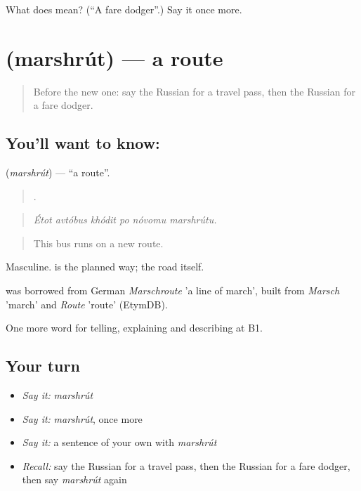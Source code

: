 \begin{tcolorbox}[breakable,colback=teal!4,colframe=teal!35!black,title={Before you move on}]
What does  mean? (\textquotedblleft{}A fare dodger\textquotedblright{}.) Say it once more.
\end{tcolorbox}
\section[\texorpdfstring{\ru{маршрут} (marshrút)}{маршрут (marshrút)}]{ (marshrút) — a route}

\label{lesson:RU-C417-marshrut}



\begin{quote}
Before the new one: say the Russian for a travel pass, then the Russian for a fare dodger.
\end{quote}

\subsection*{You'll want to know: }
\textbf{} (\emph{marshrút}) — \textquotedblleft{}a route\textquotedblright{}.

\begin{quote}
     .
\end{quote}

\begin{quote}
\emph{Étot avtóbus khódit po nóvomu marshrútu.}
\end{quote}

\begin{quote}
This bus runs on a new route.
\end{quote}

Masculine. \emph{} is the planned way; \emph{} the road itself.

\begin{cousinweb}
\emph{} was borrowed from German \emph{Marschroute} 'a line of march', built from \emph{Marsch} 'march' and \emph{Route} 'route' (EtymDB).
\end{cousinweb}

\begin{grammarlens}[title={What you've built}]
One more word for telling, explaining and describing at B1.
\end{grammarlens}

\subsection*{Your turn}
\begin{itemize}
\raggedright
  \item \emph{Say it:} \emph{marshrút}
  \item \emph{Say it:} \emph{marshrút}, once more
  \item \emph{Say it:} a sentence of your own with \emph{marshrút}
  \item \emph{Recall:} say the Russian for a travel pass, then the Russian for a fare dodger, then say \emph{marshrút} again
\end{itemize}

